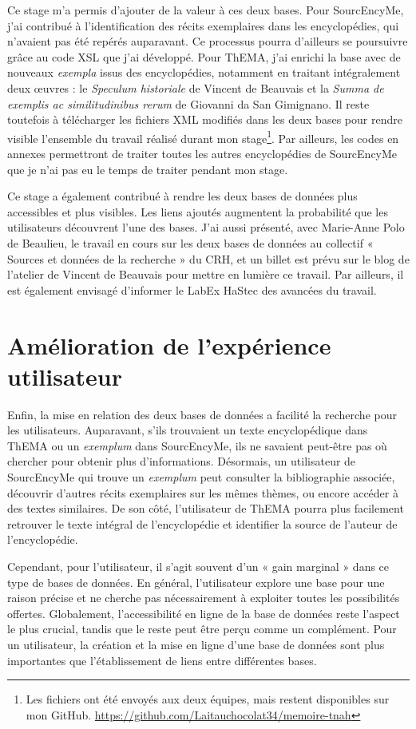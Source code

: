 Ce stage m’a permis d’ajouter de la valeur à ces deux bases. Pour SourcEncyMe, j’ai contribué à l’identification des récits exemplaires dans les encyclopédies, qui n’avaient pas été repérés auparavant. Ce processus pourra d’ailleurs se poursuivre grâce au code XSL que j’ai développé. Pour ThEMA, j’ai enrichi la base avec de nouveaux \textit{exempla} issus des encyclopédies, notamment en traitant intégralement deux œuvres : le \textit{Speculum historiale} de Vincent de Beauvais et la \textit{Summa de exemplis ac similitudinibus rerum} de Giovanni da San Gimignano. Il reste toutefois à télécharger les fichiers XML modifiés dans les deux bases pour rendre visible l’ensemble du travail réalisé durant mon stage\footnote{Les fichiers ont été envoyés aux deux équipes, mais restent disponibles sur mon GitHub. \url{https://github.com/Laitauchocolat34/memoire-tnah}}. Par ailleurs, les codes en annexes permettront de traiter toutes les autres encyclopédies de SourcEncyMe que je n'ai pas eu le temps de traiter pendant mon stage.

Ce stage a également contribué à rendre les deux bases de données plus accessibles et plus visibles. Les liens ajoutés augmentent la probabilité que les utilisateurs découvrent l’une des bases. J’ai aussi présenté, avec Marie-Anne Polo de Beaulieu, le travail en cours sur les deux bases de données au collectif « Sources et données de la recherche » du CRH, et un billet est prévu sur le blog de l’atelier de Vincent de Beauvais pour mettre en lumière ce travail. Par ailleurs, il est également envisagé d'informer le LabEx HaStec des avancées du travail.


\section{Amélioration de l'expérience utilisateur}
Enfin, la mise en relation des deux bases de données a facilité la recherche pour les utilisateurs. Auparavant, s’ils trouvaient un texte encyclopédique dans ThEMA ou un \textit{exemplum} dans SourcEncyMe, ils ne savaient peut-être pas où chercher pour obtenir plus d’informations. Désormais, un utilisateur de SourcEncyMe qui trouve un \textit{exemplum} peut consulter la bibliographie associée, découvrir d’autres récits exemplaires sur les mêmes thèmes, ou encore accéder à des textes similaires. De son côté, l’utilisateur de ThEMA pourra plus facilement retrouver le texte intégral de l’encyclopédie et identifier la source de l’auteur de l'encyclopédie. 

Cependant, pour l’utilisateur, il s’agit souvent d’un « gain marginal » dans ce type de bases de données. En général, l’utilisateur explore une base pour une raison précise et ne cherche pas nécessairement à exploiter toutes les possibilités offertes. Globalement, l’accessibilité en ligne de la base de données reste l’aspect le plus crucial, tandis que le reste peut être perçu comme un complément. Pour un utilisateur, la création et la mise en ligne d'une base de données sont plus importantes que l'établissement de liens entre différentes bases.